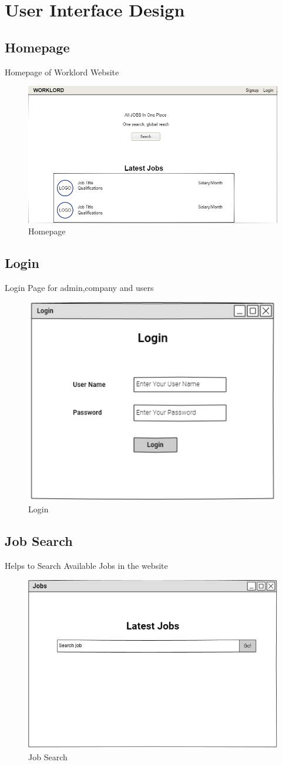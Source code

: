 \documentclass[a4paper,12pt]{report}
\begin{document}
\pagebreak
\section{User Interface Design}
\subsection {Homepage}
Homepage of Worklord Website
\begin{figure}[bph]
	\centering
	\includegraphics[width=.6\linewidth]{img/homepage}
	\caption{Homepage}
\end{figure}
\subsection {Login}
Login Page for admin,company and users
\begin{figure}[bph]
	\centering
	\includegraphics[width=.4\linewidth]{img/login}
	\caption{Login}
\end{figure}
\pagebreak

\subsection {Job Search}
Helps to Search Available Jobs in the website
\begin{figure}[bph]
	\centering
	\includegraphics[width=.65\linewidth]{img/searchjob}
	\caption{Job Search}
\end{figure}
\end{document}
